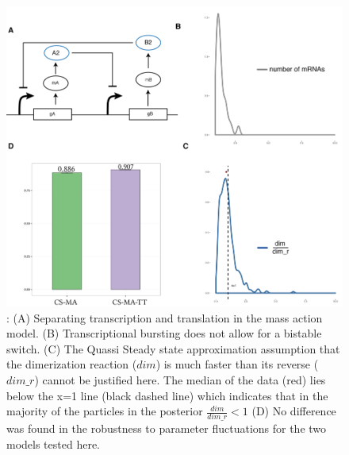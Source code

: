 \begin{figure}[h]
\begin{center}
\includegraphics[scale=0.6]{chapterStabilityFinder/images/figure-05.png}
\caption[LoF caption]{ \label{fig:fig5}: (A) Separating transcription and translation in the mass action model. (B) Transcriptional bursting does not allow for a bistable switch. (C) The Quassi Steady state approximation assumption that the dimerization reaction ($dim$) is much faster than its reverse ($dim\_r$) cannot be justified here. The median of the data (red) lies below the x=1 line (black dashed line) which indicates that in the majority of the particles in the posterior $\frac{dim}{dim\_r} < 1$  (D) No difference was found in the robustness to parameter fluctuations for the two models tested here.}
\end{center}
\end{figure}

